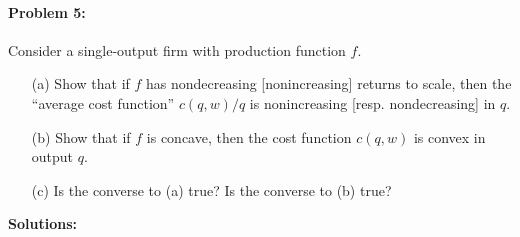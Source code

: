 \documentclass[12pt]{article}
\begin{document}
\paragraph{Problem 5:} Consider a single-output firm with production function $f$.

\begin{itemize}
    \item[(a)] Show that if $f$ has nondecreasing [nonincreasing] returns to scale, then the ``average cost function'' $c(q,w) / q$ is nonincreasing [resp. nondecreasing] in $q$.

    \item[(b)] Show that if $f$ is concave, then the cost function $c(q,w)$ is convex in output $q$.

    \item[(c)] Is the converse to (a) true? Is the converse to (b) true?
\end{itemize}

\medskip

\textbf{Solutions:}
\end{document}
